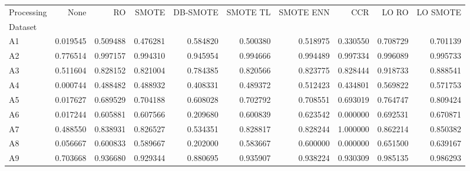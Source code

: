 \begin{tabular}{lrrrrrrrrr}
\toprule
Processing &      None &        RO &     SMOTE &  DB-SMOTE &  SMOTE TL &  SMOTE ENN &       CCR &     LO RO &  LO SMOTE \\
Dataset &           &           &           &           &           &            &           &           &           \\
\midrule
A1      &  0.019545 &  0.509488 &  0.476281 &  0.584820 &  0.500380 &   0.518975 &  0.330550 &  0.708729 &  0.701139 \\
A2      &  0.776514 &  0.997157 &  0.994310 &  0.945954 &  0.994666 &   0.994489 &  0.997334 &  0.996089 &  0.995733 \\
A3      &  0.511604 &  0.828152 &  0.821004 &  0.784385 &  0.820566 &   0.823775 &  0.828444 &  0.918733 &  0.888541 \\
A4      &  0.000744 &  0.488482 &  0.488932 &  0.408331 &  0.489372 &   0.512423 &  0.434801 &  0.569822 &  0.571753 \\
A5      &  0.017627 &  0.689529 &  0.704188 &  0.608028 &  0.702792 &   0.708551 &  0.693019 &  0.764747 &  0.809424 \\
A6      &  0.017244 &  0.605881 &  0.607566 &  0.209680 &  0.600839 &   0.623542 &  0.000000 &  0.692531 &  0.670871 \\
A7      &  0.488550 &  0.838931 &  0.826527 &  0.534351 &  0.828817 &   0.828244 &  1.000000 &  0.862214 &  0.850382 \\
A8      &  0.056667 &  0.600833 &  0.589667 &  0.202000 &  0.583667 &   0.600000 &  0.000000 &  0.651500 &  0.639167 \\
A9      &  0.703668 &  0.936680 &  0.929344 &  0.880695 &  0.935907 &   0.938224 &  0.930309 &  0.985135 &  0.986293 \\
\bottomrule
\end{tabular}
